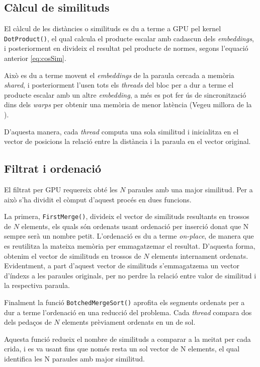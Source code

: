 \documentclass[catalan,10pt,a4paper]{article}
\begin{document}
\subsection*{Càlcul de similituds}
El càlcul de les distàncies o similituds es du a terme a GPU pel kernel \verb|DotProduct()|, el qual calcula el producte escalar amb cadascun dels \textit{embeddings}, i posteriorment en divideix el resultat pel producte de normes, segons l'equació anterior \ref{eq:cosSim}.

Això es du a terme movent el \textit{embeddings} de la paraula cercada a memòria \textit{shared}, i posteriorment l'usen tots els \textit{threads} del bloc per a dur a terme el producte escalar amb un altre \textit{embedding}, a més es pot fer ús de sincronització dins dels \textit{warps} per obtenir una memòria de menor latència (Vegeu millora de la ).

D'aquesta manera, cada \textit{thread} computa una sola similitud i inicialitza en el vector de posicions la relació entre la distància i la paraula en el vector original.
\subsection*{Filtrat i ordenació}
El filtrat per GPU requereix obté les $N$ paraules amb una major similitud. Per a això s'ha dividit el còmput d'aquest procés en dues funcions.

La primera, \verb|FirstMerge()|, divideix el vector de similituds resultants en trossos de $N$ elements, els quals són ordenats usant ordenació per inserció donat que N sempre serà un nombre petit. L'ordenació es du a terme \textit{on-place}, de manera que es reutilitza la mateixa memòria per emmagatzemar el resultat.\newline
D'aquesta forma, obtenim el vector de similituds en trossos de $N$ elements internament ordenats. Evidentment, a part d'aquest vector de similituds s'emmagatzema un vector d'índexs a les paraules originals, per no perdre la relació entre valor de similitud i la respectiva paraula.

Finalment la funció \verb|BotchedMergeSort()| aprofita els segments ordenats per a dur a terme l'ordenació en una reducció del problema. Cada \textit{thread} compara dos dels pedaços de $N$ elements prèviament ordenats en un de sol.

Aquesta funció redueix el nombre de similituds a comparar a la meitat per cada crida, i es va usant fins que només resta un sol vector de N elements, el qual identifica les N paraules amb major similitud.
\end{document}
